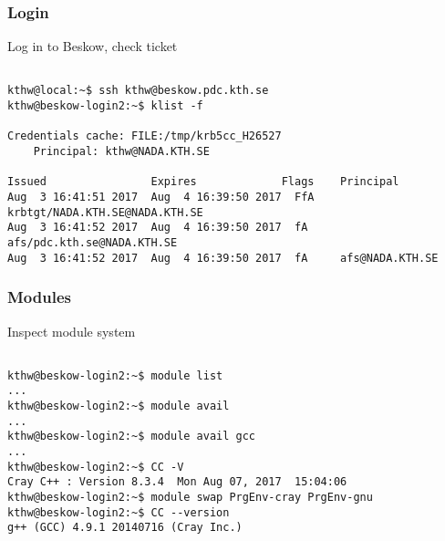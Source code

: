 \begin{frame}[fragile]
  \frametitle{Login}
  \begin{alertblock}{Log in to Beskow, check ticket}
    \verbatimfont{\footnotesize}
    \begin{verbatim}

kthw@local:~$ ssh kthw@beskow.pdc.kth.se
kthw@beskow-login2:~$ klist -f

Credentials cache: FILE:/tmp/krb5cc_H26527
    Principal: kthw@NADA.KTH.SE

Issued                Expires             Flags    Principal
Aug  3 16:41:51 2017  Aug  4 16:39:50 2017  FfA    krbtgt/NADA.KTH.SE@NADA.KTH.SE
Aug  3 16:41:52 2017  Aug  4 16:39:50 2017  fA     afs/pdc.kth.se@NADA.KTH.SE
Aug  3 16:41:52 2017  Aug  4 16:39:50 2017  fA     afs@NADA.KTH.SE

 \end{verbatim}
\end{alertblock}



\end{frame}




\begin{frame}[fragile]
  \frametitle{Modules}
  \begin{alertblock}{Inspect module system}
    \verbatimfont{\footnotesize}
    \begin{verbatim}

kthw@beskow-login2:~$ module list
...
kthw@beskow-login2:~$ module avail
...
kthw@beskow-login2:~$ module avail gcc
...
kthw@beskow-login2:~$ CC -V
Cray C++ : Version 8.3.4  Mon Aug 07, 2017  15:04:06
kthw@beskow-login2:~$ module swap PrgEnv-cray PrgEnv-gnu
kthw@beskow-login2:~$ CC --version
g++ (GCC) 4.9.1 20140716 (Cray Inc.)

 \end{verbatim}
\end{alertblock}



\end{frame}



